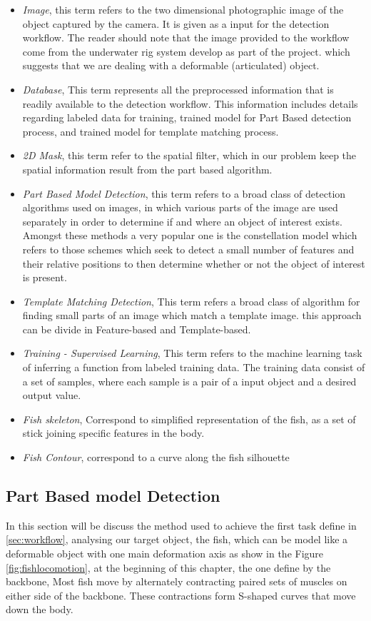 \begin{itemize}
\item \textit{Image}, this term refers to the two dimensional photographic image of the object
captured by the camera. It is given as a input for the detection workflow. The reader 
should note that the image provided to the workflow come from the underwater rig system
develop as part of the project.
which suggests that we are dealing with a deformable (articulated) object.
\item \textit{Database}, This term represents all the preprocessed information that 
is readily available to the detection workflow. This information includes details
regarding labeled data for training, trained model for Part Based detection process,
and trained model for template matching process.
\item \textit{2D Mask}, this term refer to the spatial filter, which in our problem
keep the spatial information result from the part based algorithm.
\item \textit{Part Based Model Detection}, this term refers to a broad class of 
detection algorithms used on images, in which various parts of the image are used 
separately in order to determine if and where an object of interest exists. 
Amongst these methods a very popular one is the constellation model which refers 
to those schemes which seek to detect a small number of features and their relative 
positions to then determine whether or not the object of interest is present. 
\item \textit{Template Matching Detection}, This term refers a broad class of algorithm
for finding small parts of an image which match a template image. this approach can be divide in
Feature-based and Template-based.
\item \textit{Training - Supervised Learning}, This term refers to the machine learning task
of inferring a function from labeled training data. The training data consist of a set of samples, 
where each sample is a pair of a input object and a desired output value.
\item \textit{Fish skeleton}, Correspond to simplified representation of the fish, as a set
of stick joining specific features in the body.
\item \textit{Fish Contour}, correspond to a curve along the fish silhouette
\end{itemize}

\subsection{Part Based model Detection}
\label{sec:partbased}
In this section will be discuss the method used to achieve the first task define in \ref{sec:workflow},
analysing our target object, the fish, which can be model like a deformable object 
with one main deformation axis as show in the Figure \ref{fig:fishlocomotion}, at the beginning
of this chapter, the one define by the backbone, Most fish move by alternately contracting paired
sets of muscles on either side of the backbone. These contractions form S-shaped curves that move down the body.

